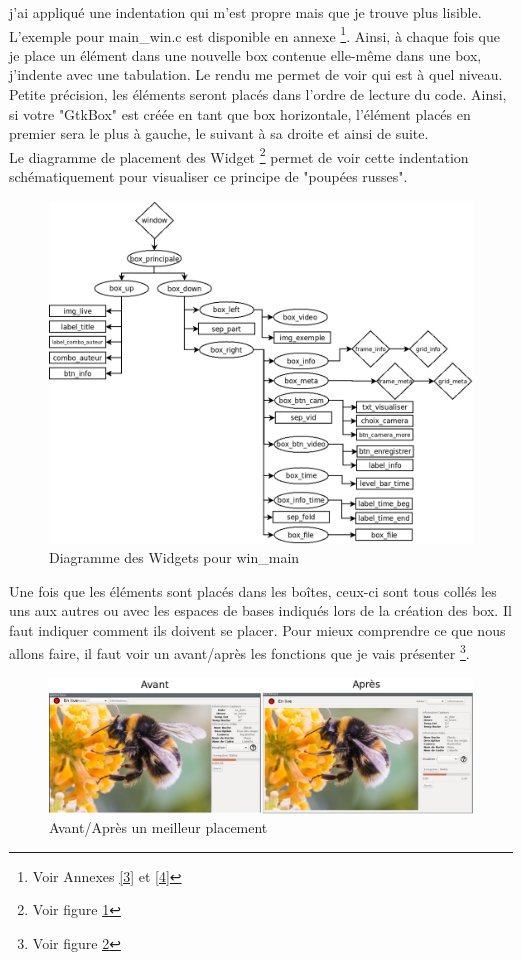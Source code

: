 \documentclass[11pt,french,a4paper]{report}
\begin{document}
j'ai appliqué une indentation  qui m'est propre mais que je trouve plus lisible. L'exemple pour main\_win.c est disponible en annexe
\footnote{Voir Annexes \ref{3} et \ref{4}}. 
Ainsi, à chaque fois que je place un élément dans une nouvelle box contenue elle-même dans une box, j'indente avec une 
tabulation. Le rendu me permet de voir qui est à quel niveau. \\
Petite précision, les éléments seront placés dans l'ordre de lecture du code. Ainsi, si votre "GtkBox" est créée en tant
que box horizontale, l'élément placés en premier sera le plus à gauche, le suivant à sa droite et ainsi de suite. \\ 
Le diagramme de placement des Widget \footnote{Voir figure \ref{org_win_main}} permet de voir cette 
indentation schématiquement pour visualiser ce principe de "poupées russes".
\begin{figure}[!h]
\centering
\includegraphics[scale=0.5]{../images/dia/diagramme_fenetre.png} 
        \caption{Diagramme des Widgets pour win\_main}
        \label{org_win_main}
\end{figure}
Une fois que les éléments sont placés dans les boîtes, ceux-ci sont tous collés les uns aux autres ou avec 
les espaces de bases indiqués lors de la création des box. 
Il faut indiquer comment ils doivent se placer. Pour mieux comprendre ce que nous allons faire, il faut voir un 
avant/après les fonctions que je vais présenter \footnote{Voir figure \ref{avap}}.

\begin{figure}[!h]
    \centering
    \includegraphics[scale=0.4]{../images/annexes/av_ap.png} 
    \caption{Avant/Après un meilleur placement}
    \label{avap}
\end{figure}
\end{document}
